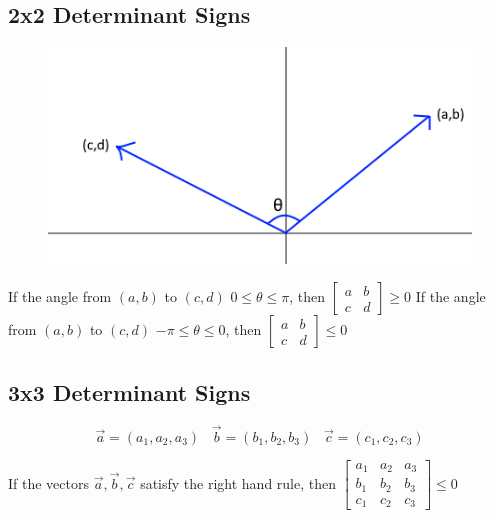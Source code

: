 \documentclass{article}
\begin{document}
\subsection{2x2 Determinant Signs}
\begin{figure}[h!]
    \centering
    \includegraphics[scale=.5]{2x2DeterminantSign.png}
    \label{}
\end{figure}
If the angle from $(a,b)$ to $(c,d)$ $0\leq \theta\leq\pi$, then $\begin{bmatrix}
    a&b\\
    c&d
\end{bmatrix}\geq0$
\newline
If the angle from $(a,b)$ to $(c,d)$ $-\pi \leq \theta\leq 0$, then $\begin{bmatrix}
    a&b\\
    c&d
\end{bmatrix}\leq0$

\subsection{3x3 Determinant Signs}
\[\vec{a}=(a_1,a_2,a_3)\;\;\; \vec{b}=(b_1,b_2,b_3)\;\;\; \vec{c}=(c_1,c_2,c_3)\]

If the vectors $\vec{a},\vec{b},\vec{c}$ satisfy the right hand rule, then $\begin{bmatrix}
    a_1&a_2&a_3\\
    b_1&b_2&b_3\\
    c_1&c_2&c_3
\end{bmatrix}\leq 0$
\end{document}

